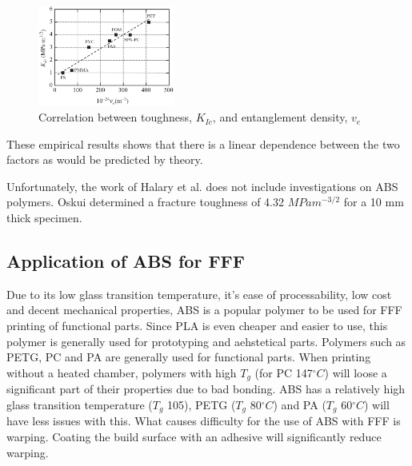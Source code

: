 \begin{figure}[H]
    \centering
    \includegraphics[width=0.4\textwidth]{chapter_2/figures/KIc.png}
    \caption{Correlation between toughness, $K_{Ic}$, and entanglement density, $v_e$  \cite{Halary2011PolymerMaterials}}
    \label{fig:stresscrack}
\end{figure}
These empirical results shows that there is a linear dependence  between the two factors as would be predicted by theory. 

Unfortunately, the work of Halary et al. does not include investigations on ABS polymers. 
Oskui \cite{Oskui2014ExperimentalDevice} determined a fracture toughness of 4.32 $MPa m^{-3/2}$ for a 10 mm thick specimen. %


\subsection{Application of ABS for FFF}
\label{Application of ABS for FFF}
Due to its low glass transition temperature, it's ease of processability, low cost and decent mechanical properties, ABS is a popular polymer to be used for FFF printing of functional parts. Since PLA is even cheaper and easier to use, this polymer is generally used for prototyping and aehstetical parts. Polymers such as PETG, PC and PA are generally used for functional parts. When printing without a heated chamber, polymers with high $T_g$ (for PC 147$^\circ C$) will loose a significant part of their properties due to bad bonding. ABS has a relatively high glass transition temperature ($T_g$ 105), PETG ($T_g$ 80$^\circ C$) and PA ($T_g$ 60$^\circ C$) will have less issues with this. What causes difficulty for the use of ABS with FFF is warping. Coating the build surface with an adhesive will significantly reduce warping.


